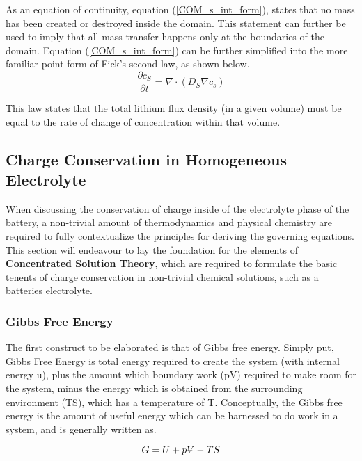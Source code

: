\documentclass[lettersize,journal]{IEEEtran}
\newcommand{\volume}{{\ooalign{\hfil$V$\hfil\cr\kern0.08em--\hfil\cr}}}
\begin{document}
 As an equation of continuity, equation (\ref{COM_s_int_form}), states that no mass has been created or destroyed inside the domain. This statement can further be used to imply that all mass transfer happens only at the boundaries of the domain. Equation (\ref{COM_s_int_form}) can be further simplified into the more familiar point form of Fick's second law, as shown below.
\begin{equation}
    \frac{\partial c_{S}}{\partial t} = \nabla \cdot \left( D_{S} \nabla c_{s} \right)
\end{equation}

This law states that the total lithium flux density (in a given volume) must be equal to the rate of change of concentration within that volume.


\subsection{Charge Conservation in Homogeneous Electrolyte}

When discussing the conservation of charge inside of the electrolyte phase of the battery, a non-trivial amount of thermodynamics and physical chemistry are required to fully contextualize the principles for deriving the governing equations. \\

This section will endeavour to lay the foundation for the elements of \textbf{Concentrated Solution Theory}, which are required to formulate the basic tenents of charge conservation in non-trivial chemical solutions, such as a batteries electrolyte. \\

\subsubsection{Gibbs Free Energy}
The first construct to be elaborated is that of Gibbs free energy. Simply put, Gibbs Free Energy is total energy required to create the system (with internal energy u), plus the amount which boundary work (pV) required to make room for the system, minus the energy which is obtained from the surrounding environment (TS), which has a temperature of T. Conceptually, the Gibbs free energy is the amount of useful energy which can be harnessed to do work in a system, and is generally written as.

\begin{equation} \label{gibbs_free_energy}
  G = U + p{\volume} - TS
\end{equation}
\end{document}
